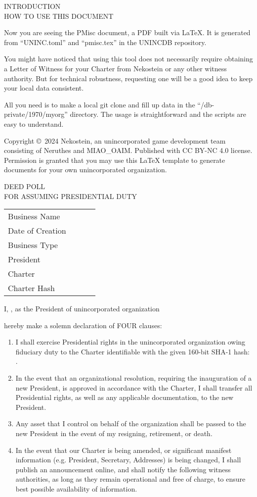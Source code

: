 \documentclass[10pt,a4paper]{article}
\newcommand{\newdochere}[1]{
    \setcounter{page}{1}
    \setcounter{section}{0}
    \begin{center}%
        \large\rmfamily\mdseries\strut#1
    \end{center}\par
}
\newcommand{\stdorginfo}[0]{
    \parbox{\linewidth}{
        \tabcolsep=0pt
        \small
        \begin{tabu}{lX}
            \toprule
            \mdseries Business Name~~~~~~ & \fulltomldataATfullname \\
            \mdseries Date of Creation & \fulltomldataATdatecreation \\
            \mdseries Business Type & \fulltomldataATtype \\
            \mdseries President & \fulltomldataATpresident \\
            \mdseries Charter & \uninctomldataATwitnessFIRST \\
            \mdseries Charter Hash & \fulltomldataATcharterhash \\
            \bottomrule
        \end{tabu}
    }\par\vskip 10pt
}
\begin{document}
\newdochere{INTRODUCTION\\HOW TO USE THIS DOCUMENT}
\thispagestyle{empty}

Now you are seeing the PMisc document, a PDF built via \LaTeX.
It is generated from ``UNINC.toml'' and ``pmisc.tex'' in the UNINCDB repository.

You might have noticed that using this tool does not necessarily require obtaining a Letter of Witness
for your Charter from Nekostein or any other witness authority.
But for technical robustness, requesting one will be a good idea to keep your local data consistent.

All you need is to make a local git clone and fill up data in the ``/db-private/1970/myorg'' directory.
The usage is straightforward and the scripts are easy to understand.


Copyright \copyright~2024 Nekostein, an unincorporated game development team consisting of Neruthes and MIAO\_OAIM.
Published with CC BY-NC 4.0 license.
Permission is granted that you may use this \LaTeX{} template to generate documents for your own unincorporated organization.






\clearpage
\newdochere{\MakeUppercase{DEED POLL\\For Assuming Presidential Duty}}
\thispagestyle{empty}

\stdorginfo

\strut I,
\underline{\fulltomldataATpresident},
as the President of unincorporated organization

\underline{\fulltomldataATfullname}

hereby make a solemn declaration of FOUR clauses:

\begin{enumerate}
    \item I shall exercise Presidential rights in the unincorporated organization owing fiduciary duty to the Charter
        identifiable with the given 160-bit SHA-1 hash:\\
        \underline{\fulltomldataATcharterhash}.
    \item In the event that an organizational resolution, requiring the inauguration of a new President,
        is approved in accordance with the Charter, I shall transfer all Presidential rights,
        as well as any applicable documentation, to the new President.
    \item Any asset that I control on behalf of the organization shall be passed to the new President
        in the event of my resigning, retirement, or death.
    \item In the event that our Charter is being amended, or significant manifest information
        (e.g. President, Secretary, Addresses) is being changed,
        I shall publish an announcement online, and shall notify the following witness authorities,
        as long as they remain operational and free of charge,
        to ensure best possible availability of information.
        \begin{compactitem}
            \uninctomldataATwitnessITEM
        \end{compactitem}
\end{enumerate}
\end{document}
